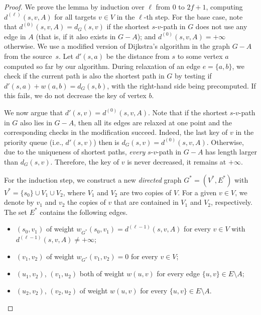 \documentclass{article}\usepackage[a4paper,margin=20mm]{geometry}
\begin{document}
\begin{proof}
We prove the lemma by induction over $\ell$ from $0$ to $2f{+}1$,
computing  $d^{(\ell)}(s, v, A)$ for all targets $v \in V$ in the $\ell$-th step.
%
For the base case, 
note that $d^{(0)}(s,v,A) = d_G(s,v)$ if the shortest $s$-$v$-path in $G$
does not use any edge in $A$ (that is, if it also exists in $G-A$);
and $d^{(0)}(s,v,A) = +\infty$ otherwise.
We use a modified version of Dijkstra's algorithm in the graph $G-A$ from the source~$s$.
Let $d'(s, a)$ be the distance from $s$ to some vertex $a$
computed so far by our algorithm.
During relaxation of an edge $e = \{a, b\}$, we check if the current path is also the shortest path in $G$
by testing if $d'(s,a) + w(a, b) = d_G(s,b)$, with the right-hand side being precomputed.
If this fails, we do not decrease the key of vertex $b$.

We now argue that $d'(s,v) = d^{(0)}(s,v,A)$.
Note that if the shortest $s$-$v$-path in $G$ also lies in $G{-}A$,
then all its edges are relaxed at one point 
and the corresponding checks in the modification succeed.
Indeed, the last key of $v$ in the priority queue (i.e., $d'(s,v)$) 
then is $d_{G}(s,v) = d^{(0)}(s,v,A)$.
Otherwise, due to the uniqueness of shortest paths,
\emph{every} $s$-$v$-path in $G-A$ has length larger than $d_G(s,v)$.
Therefore, the key of $v$ is never decreased, it remains at $+\infty$.

For the induction step, we construct a new \emph{directed} graph $G^*= (V^*, E^*)$ with $V^* = \{s_0\} \cup V_1 \cup V_2$, where $V_1$ and $V_2$ are two copies of $V$. 
For a given $v \in V$, we denote by $v_1$ and $v_2$ the copies of $v$ that are contained in $V_1$ and $V_2$, respectively.
The set $E^*$ contains the following edges.
\begin{itemize}
    \item $(s_0,v_1)$ of weight $w_{G^*}(s_0,v_1)=d^{(\ell-1)}(s, v, A)$
    	for every $v \in V$ with $d^{(\ell-1)}(s, v, A) \neq +\infty$;
    \item $(v_1,v_2)$ of weight $w_{G^*}(v_1,v_2)=0$ for every $v \in V$;
    \item $(u_1,v_2)$, $(v_1,u_2)$ both of weight $w(u,v)$ 
    	for every edge $\{u,v\} \in E {\setminus} A$;
    \item $(u_2,v_2)$, $(v_2,u_2)$ of weight $w(u,v)$ for every $\{u,v\} \in E {\setminus} A$.
\end{itemize}


\begin{figure}[t]


\end{figure}
\end{proof}
\end{document}
